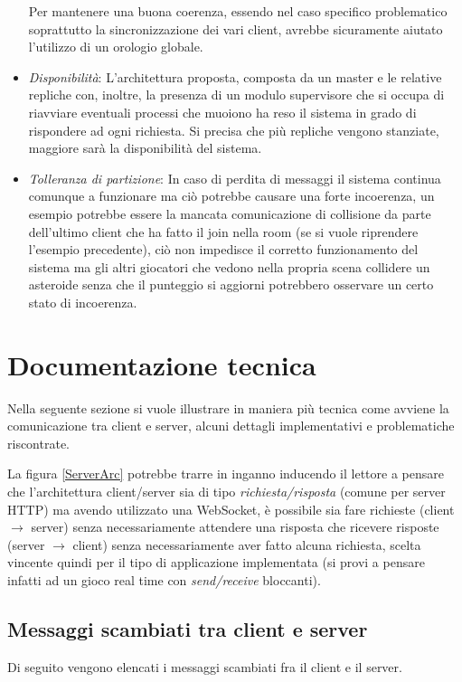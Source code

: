 \documentclass[paper=a4, fontsize=11pt]{scrartcl} %
\numberwithin{equation}{section} %
\numberwithin{figure}{section} %
\numberwithin{table}{section} %
\begin{document}
\begin{itemize}
Per mantenere una buona coerenza, essendo nel caso specifico problematico soprattutto la sincronizzazione dei vari client, avrebbe sicuramente aiutato l'utilizzo di un orologio globale.
\item \textit{Disponibilità}: L'architettura proposta, composta da un master e le relative repliche con, inoltre, la presenza di un modulo supervisore che si occupa di riavviare eventuali processi che muoiono ha reso il sistema in grado di rispondere ad ogni richiesta. Si precisa che più repliche vengono stanziate, maggiore sarà la disponibilità del sistema.
\item \textit{Tolleranza di partizione}: In caso di perdita di messaggi il sistema continua comunque a funzionare ma ciò potrebbe causare una forte incoerenza, un esempio potrebbe essere la mancata comunicazione di collisione da parte dell'ultimo client che ha fatto il join nella room (se si vuole riprendere l'esempio precedente), ciò non impedisce il corretto funzionamento del sistema ma gli altri giocatori che vedono nella propria scena collidere un asteroide senza che il punteggio si aggiorni potrebbero osservare un certo stato di incoerenza.
\end{itemize}

\section{Documentazione tecnica}
\label{DocumentazioneTecnica}
Nella seguente sezione si vuole illustrare in maniera più tecnica come avviene la comunicazione tra client e server, alcuni dettagli implementativi e problematiche riscontrate.

La figura \ref{ServerArc} potrebbe trarre in inganno inducendo il lettore a pensare che l'architettura client/server sia di tipo \textit{richiesta/risposta} (comune per server HTTP) ma avendo utilizzato una WebSocket, è possibile sia fare richieste (client $\rightarrow$ server) senza necessariamente attendere una risposta che ricevere risposte (server $\rightarrow$ client) senza necessariamente aver fatto alcuna richiesta, scelta vincente quindi per il tipo di applicazione implementata (si provi a pensare infatti ad un gioco real time con \textit{send/receive} bloccanti).

\subsection{Messaggi scambiati tra client e server}

Di seguito vengono elencati i messaggi scambiati fra il client e il server.
\end{document}
